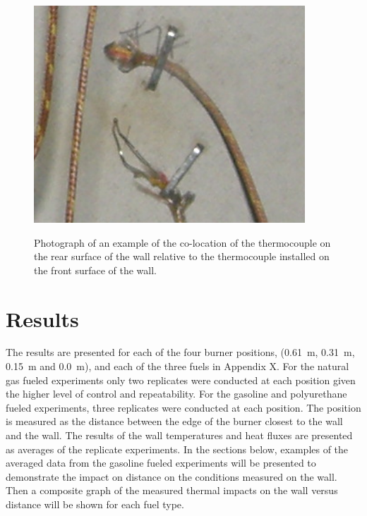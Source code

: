 \documentclass[twoside]{uocthesis}
\begin{document}
{{\begin{figure}
	\centering
	\includegraphics[width=4.0in]{../Figures/Instrumented_Wall_Detail_Rear_TC_photo}\\
	\caption[Photograph of an example of the co-location of the thermocouple on the rear surface of the wall relative to the thermocouple installed on the front surface of the wall]{Photograph of an example of the co-location of the thermocouple on the rear surface of the wall relative to the thermocouple installed on the front surface of the wall.}
	\label{Instrumented_Wall_Detail_Rear_TC_photo}
\end{figure}


\section{Results}

The results are presented for each of the four burner positions, (0.61~m, 0.31~m, 0.15~m and 0.0~m), and each of the three fuels in Appendix X.  For the natural gas fueled experiments only two replicates were conducted at each position given the higher level of control and repeatability.  For the gasoline and polyurethane fueled experiments, three replicates were conducted at each position. The position is measured as the distance between the edge of the burner closest to the wall and the wall.  The results of the wall temperatures and heat fluxes are presented as averages of the replicate experiments.  In the sections below, examples of the averaged data from the gasoline fueled experiments will be presented to demonstrate the impact on distance on the conditions measured on the wall. Then a composite graph of the measured thermal impacts on the wall versus distance will be shown for each fuel type.

}}
\end{document}
